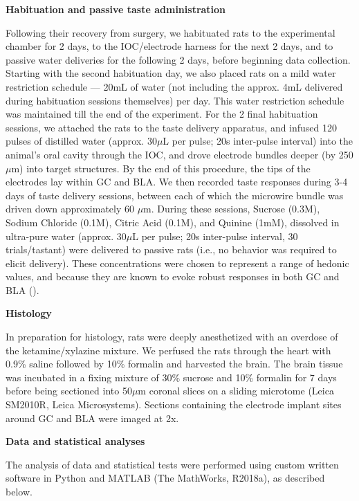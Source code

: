 \begin{refsection}
\smallskip
\noindent\textbf{Habituation and passive taste administration}\par
\noindent Following their recovery from surgery, we habituated rats to the experimental chamber for 2 days, to the IOC/electrode harness for the next 2 days, and to passive water deliveries for the following 2 days, before beginning data collection. Starting with the second habituation day, we also placed rats on a mild water restriction schedule --- 20mL of water (not including the approx. 4mL delivered during habituation sessions themselves) per day. This water restriction schedule was maintained till the end of the experiment. For the 2 final habituation sessions, we attached the rats to the taste delivery apparatus, and infused 120 pulses of distilled water (approx. 30$\mu$L per pulse; 20s inter-pulse interval) into the animal’s oral cavity through the IOC, and drove electrode bundles deeper (by 250 $\mu$m) into target structures. By the end of this procedure, the tips of the electrodes lay within GC and BLA. We then recorded taste responses during 3-4 days of taste delivery sessions, between each of which the microwire bundle was driven down approximately 60 $\mu$m. During these sessions, Sucrose (0.3M), Sodium Chloride (0.1M), Citric Acid (0.1M), and Quinine (1mM), dissolved in ultra-pure water (approx. 30$\mu$L per pulse; 20s inter-pulse interval, 30 trials/tastant) were delivered to passive rats (i.e., no behavior was required to elicit delivery). These concentrations were chosen to represent a range of hedonic values, and because they are known to evoke robust responses in both GC and BLA (\cite{fontanini2009a,sadacca2012a}).

\smallskip
\noindent\textbf{Histology}\par
\noindent In preparation for histology, rats were deeply anesthetized with an overdose of the ketamine/xylazine mixture. We perfused the rats through the heart with 0.9\% saline followed by 10\% formalin and harvested the brain. The brain tissue was incubated in a fixing mixture of 30\% sucrose and 10\% formalin for 7 days before being sectioned into 50$\mu$m coronal slices on a sliding microtome (Leica SM2010R, Leica Microsystems). Sections containing the electrode implant sites around GC and BLA were imaged at 2x.

\smallskip
\noindent\textbf{Data and statistical analyses}\par
\noindent The analysis of data and statistical tests were performed using custom written software in Python and MATLAB (The MathWorks, R2018a), as described below.


\end{refsection}
